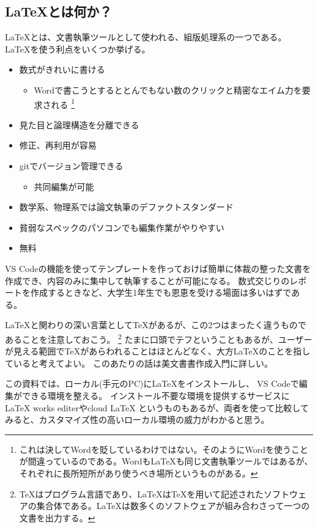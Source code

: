 \documentclass{ltjsarticle}
\begin{document}
\subsection{\LaTeX とは何か？}
\LaTeX とは、文書執筆ツールとして使われる、組版処理系の一つである。
\LaTeX を使う利点をいくつか挙げる。
\begin{itemize}
  \item 数式がきれいに書ける
  \begin{itemize}
    \item Wordで書こうとするととんでもない数のクリックと精密なエイム力を要求される
    \footnote{これは決してWordを貶しているわけではない。そのようにWordを使うことが間違っているのである。Wordも\LaTeX も同じ文書執筆ツールではあるが、それぞれに長所短所があり使うべき場所というものがある。}
  \end{itemize}
  \item 見た目と論理構造を分離できる
  \item 修正、再利用が容易
  \item gitでバージョン管理できる
  \begin{itemize}
    \item 共同編集が可能
  \end{itemize}
  \item 数学系、物理系では論文執筆のデファクトスタンダード
  \item 貧弱なスペックのパソコンでも編集作業がやりやすい
  \item 無料
\end{itemize}
VS Codeの機能を使ってテンプレートを作っておけば簡単に体裁の整った文書を作成でき、内容のみに集中して執筆することが可能になる。
数式交じりのレポートを作成するときなど、大学生1年生でも恩恵を受ける場面は多いはずである。

\LaTeX と関わりの深い言葉として\TeX があるが、この2つはまったく違うものであることを注意しておこう。
\footnote{\TeX はプログラム言語であり、\LaTeX は\TeX を用いて記述されたソフトウェアの集合体である。\LaTeX は数多くのソフトウェアが組み合わさって一つの文書を出力する。}
たまに口頭でテフということもあるが、ユーザーが見える範囲で\TeX があらわれることはほとんどなく、大方\LaTeX のことを指していると考えてよい。
このあたりの話は美文書書作成入門\cite{美文書本}に詳しい。

この資料では、ローカル(手元のPC)に\LaTeX をインストールし、
VS Codeで編集ができる環境を整える。
インストール不要な環境を提供するサービスにLaTeX works editerやcloud LaTeX というものもあるが、両者を使って比較してみると、カスタマイズ性の高いローカル環境の威力がわかると思う。
\end{document}
